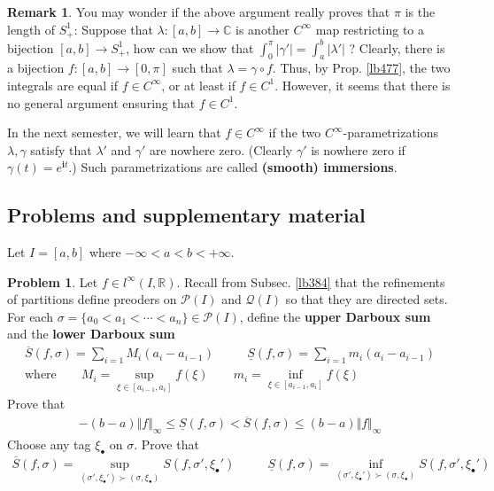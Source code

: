 \documentclass[12pt,b5paper,notitlepage]{article}
\theoremstyle{definition}
\newtheorem{rem}[df]{Remark}
\newtheorem{prob}{\color{red}Problem}[section]
\theoremstyle{plain}
\newcommand{\mc}{\mathcal}
\newcommand{\ovl}{\overline}
\newcommand{\im}{\mathbf{i}}
\newcommand{\blt}{\bullet}
\newcommand{\Cbb}{\mathbb C}
\newcommand{\Rbb}{\mathbb R}
\numberwithin{equation}{section}
\begin{document}
\begin{rem}
You may wonder if the above argument really proves that $\pi$ is the length of $S^1_+$: Suppose that $\lambda:[a,b]\rightarrow \Cbb$ is another $C^\infty$ map restricting to a bijection $[a,b]\rightarrow S^1_+$, how can we show that $\int_0^\pi |\gamma'|=\int_a^b|\lambda'|$ ? Clearly, there is a bijection $f:[a,b]\rightarrow[0,\pi]$ such that $\lambda=\gamma\circ f$. Thus, by Prop. \ref{lb477}, the two integrals are equal if $f\in C^\infty$, or at least if $f\in C^1$. However, it seems that there is no general argument ensuring that $f\in C^1$.

In the next semester, we will learn that $f\in C^\infty$ if the two $C^\infty$-parametrizations $\lambda,\gamma$ satisfy that $\lambda'$ and $\gamma'$ are nowhere zero. (Clearly $\gamma'$ is nowhere zero if $\gamma(t)=e^{\im t}$.) Such parametrizations are called \textbf{(smooth) immersions}.  \hfill\qedsymbol
\end{rem}









\subsection{Problems and supplementary material}


Let $I=[a,b]$ where $-\infty<a<b<+\infty$.



\begin{prob}\label{lb386}
Let $f\in l^\infty(I,\Rbb)$. Recall from Subsec. \ref{lb384} that the refinements of partitions define preoders on $\mc P(I)$ and $\mc Q(I)$ so that they are directed sets. For each $\sigma=\{a_0<a_1<\cdots<a_n\}\in\mc P(I)$, define the \textbf{upper Darboux sum} and the \textbf{lower Darboux sum} 
\begin{gather*}
\ovl S(f,\sigma)=\sum_{i=1}M_i(a_i-a_{i-1})\qquad~~~ \underline S(f,\sigma)=\sum_{i=1}m_i(a_i-a_{i-1})\\
\text{where}\qquad M_i=\sup_{\xi\in[a_{i-1},a_i]}f(\xi)\qquad m_i=\inf_{\xi\in[a_{i-1},a_i]}f(\xi)
\end{gather*}
Prove that 
\begin{align*}
-(b-a)\Vert f\Vert_\infty\leq\underline S(f,\sigma)<\ovl S(f,\sigma)\leq (b-a)\Vert f\Vert_\infty
\end{align*}
Choose any tag $\xi_\blt$ on $\sigma$. Prove that
\begin{gather}
\ovl S(f,\sigma)=\sup_{(\sigma',\xi_\blt')\succ (\sigma,\xi_\blt)} S(f,\sigma',\xi_\blt')\qquad~~~ \underline S(f,\sigma)=\inf_{(\sigma',\xi_\blt')\succ (\sigma,\xi_\blt)} S(f,\sigma',\xi_\blt')
\end{gather}
\end{prob}
\end{document}
